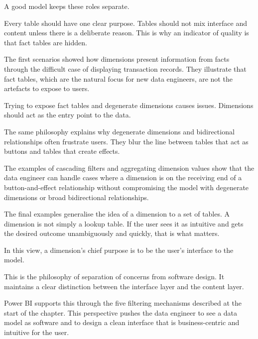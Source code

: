 \documentclass[10pt,openany,10pt]{book}
\begin{document}
A good model keeps these roles separate.

Every table should have one clear purpose. Tables should not mix
interface and content unless there is a deliberate reason. This is why
an indicator of quality is that fact tables are hidden.

The first scenarios showed how dimensions present information from facts
through the difficult case of displaying transaction records. They
illustrate that fact tables, which are the natural focus for new data
engineers, are not the artefacts to expose to users.

Trying to expose fact tables and degenerate dimensions causes issues.
Dimensions should act as the entry point to the data.

The same philosophy explains why degenerate dimensions and bidirectional
relationships often frustrate users. They blur the line between tables
that act as buttons and tables that create effects.

The examples of cascading filters and aggregating dimension values show
that the data engineer can handle cases where a dimension is on the
receiving end of a button-and-effect relationship without compromising
the model with degenerate dimensions or broad bidirectional
relationships.

The final examples generalise the idea of a dimension to a set of
tables. A dimension is not simply a lookup table. If the user sees it as
intuitive and gets the desired outcome unambiguously and quickly, that
is what matters.

In this view, a dimension's chief purpose is to be the user's interface
to the model.

This is the philosophy of separation of concerns from software design.
It maintains a clear distinction between the interface layer and the
content layer.

Power BI supports this through the five filtering mechanisms described
at the start of the chapter. This perspective pushes the data engineer
to see a data model as software and to design a clean interface that is
business-centric and intuitive for the user.
\end{document}
